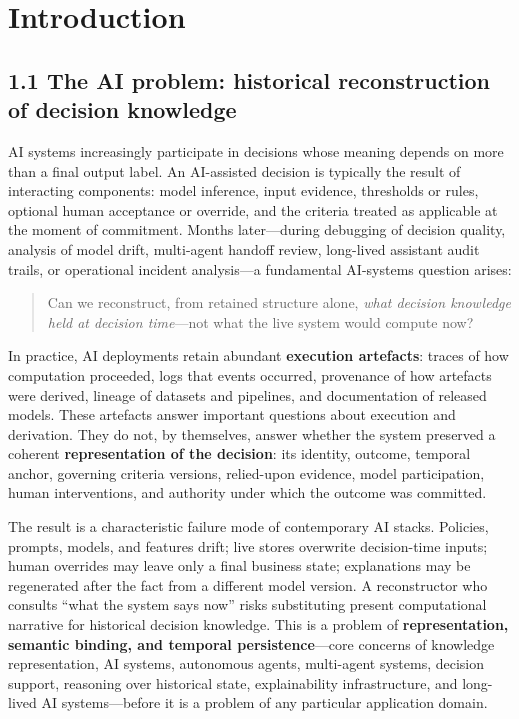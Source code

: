 \documentclass[11pt,a4paper]{article}
\begin{document}
\section{Introduction}

\subsection{1.1 The AI problem: historical reconstruction of decision knowledge}

AI systems increasingly participate in decisions whose meaning depends on more than a final output label. An AI-assisted decision is typically the result of interacting components: model inference, input evidence, thresholds or rules, optional human acceptance or override, and the criteria treated as applicable at the moment of commitment. Months later---during debugging of decision quality, analysis of model drift, multi-agent handoff review, long-lived assistant audit trails, or operational incident analysis---a fundamental AI-systems question arises:


\begin{quote}
Can we reconstruct, from retained structure alone, \emph{what decision knowledge held at decision time}---not what the live system would compute now?
\end{quote}

In practice, AI deployments retain abundant \textbf{execution artefacts}: traces of how computation proceeded, logs that events occurred, provenance of how artefacts were derived, lineage of datasets and pipelines, and documentation of released models. These artefacts answer important questions about execution and derivation. They do not, by themselves, answer whether the system preserved a coherent \textbf{representation of the decision}: its identity, outcome, temporal anchor, governing criteria versions, relied-upon evidence, model participation, human interventions, and authority under which the outcome was committed.


The result is a characteristic failure mode of contemporary AI stacks. Policies, prompts, models, and features drift; live stores overwrite decision-time inputs; human overrides may leave only a final business state; explanations may be regenerated after the fact from a different model version. A reconstructor who consults ``what the system says now'' risks substituting present computational narrative for historical decision knowledge. This is a problem of \textbf{representation, semantic binding, and temporal persistence}---core concerns of knowledge representation, AI systems, autonomous agents, multi-agent systems, decision support, reasoning over historical state, explainability infrastructure, and long-lived AI systems---before it is a problem of any particular application domain.
\end{document}
